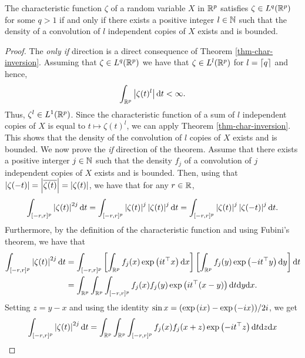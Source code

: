 \begin{lemma} \label{lem-char-integrable-convolution}
    The characteristic function $\zeta$ of a random variable $X$ in $\Rp$ satisfies $\zeta \in L^q(\Rp)$ for some $q > 1$ if and only if there exists a positive integer $l \in \N$ such that the density of a convolution of $l$ independent copies of $X$ exists and is bounded.
\end{lemma}
\begin{proof}
    The \textit{only if} direction is a direct consequence of Theorem \ref{thm-char-inversion}. Assuming that $\zeta \in L^q(\Rp)$ we have that $\zeta \in L^l(\Rp)$ for $l = \ceil{q}$ and hence,
    \begin{equation*}
        \intRp{t}{\abs{\zeta(t)^l}} < \infty.
    \end{equation*}
    Thus, $\zeta^l \in L^1(\Rp)$. Since the characteristic function of a sum of $l$ independent copies of $X$ is equal to $t \mapsto \zeta(t)^l$, we can apply Theorem \ref{thm-char-inversion}. This shows that the density of the convolution of $l$ copies of $X$ exists and is bounded.
    \newline
    We now prove the \textit{if} direction of the theorem. Assume that there exists a positive interger $j \in \N$ such that the density $f_j$ of a convolution of $j$ independent copies of $X$ exists and is bounded. Then, using that $\abs{\zeta(-t)} = \abs{\overline{\zeta(t)}} = \abs{\zeta(t)}$, we have that for any $r \in \R$,
    \begin{equation*}
        \int_{[-r, r]^p} \abs{\zeta(t)}^{2j} \d t
        = \int_{[-r, r]^p} \abs{\zeta(t)}^j\abs{\zeta(t)}^j \d t
        = \int_{[-r, r]^p} \abs{\zeta(t)}^j\abs{\zeta(-t)}^j \d t.
    \end{equation*}
    Furthermore, by the definition of the characteristic function and using Fubini's theorem, we have that
    \begin{align*}
        \int_{[-r, r]^p} \abs{\zeta(t)}^{2j} \d t
        &= \int_{[-r, r]^p} \left[\intRp{x}{f_j(x)\expf{it^\top x}}\right]\left[\intRp{y}{f_j(y)\expf{-it^\top y}}\right] \d t\\
        &= \intRp{x}{\intRp{y}{\int_{[-r, r]^p} f_j(x)f_j(y)\expf{it^\top (x - y)}\d t}}.
    \end{align*}
    Setting $z = y - x$ and using the identity $\sin x = (\expf{ix} - \expf{-ix}) / 2i$, we get
    \begin{align*}
        \int_{[-r, r]^p} \abs{\zeta(t)}^{2j} \d t
        &= \intRp{x}{\intRp{z}{\int_{[-r, r]^p} f_j(x)f_j(x + z)\expf{-it^\top z}\d t}}\\

\end{align*}
\end{proof}
